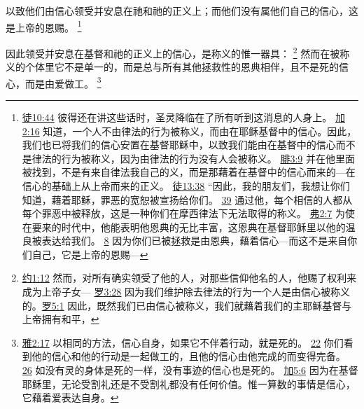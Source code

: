 \documentclass[12pt, a4paper, oneside]{ctexart}
\newcounter{parnum}[section]
\newcommand{\N}{%
   \noindent\refstepcounter{parnum}%
    \makebox[\parindent][l]{\textbf{\arabic{parnum}.}}}
\begin{document}
	以致他们由信心领受并安息在祂和祂的正义上；而他们没有属他们自己的信心，这是上帝的恩赐。
	\footnote {
		\href{https://biblehub.com/acts/10-44.htm}{徒10:44} 彼得还在讲这些话时，圣灵降临在了所有听到这消息的人身上。
		\href{https://biblehub.com/galatians/2-16.htm}{加2:16} 知道，一个人不由律法的行为被称义，而由在耶稣基督中的信心。因此，我们也已将我们的信心安置在基督耶稣中，以致我们能由在基督中的信心而不是律法的行为被称义，因为由律法的行为没有人会被称义。
		\href{https://biblehub.com/philippians/3-9.htm}{腓3:9} 并在他里面被找到，不是有来自律法我自己的义，而是那藉着在基督中的信心而来的---在信心的基础上从上帝而来的正义。
		\href{https://biblehub.com/acts/13-38.htm}{徒13:38} “因此，我的朋友们，我想让你们知道，藉着耶稣，罪恶的宽恕被宣扬给你们。
		\href{https://biblehub.com/acts/13-39.htm}{39} 通过他，每个相信的人都从每个罪恶中被释放，这是一种你们在摩西律法下无法取得的称义。
		\href{https://biblehub.com/ephesians/2-7.htm}{弗2:7} 为使在要来的时代中，他能表明他恩典的无比丰富，这恩典在基督耶稣里以他的温良被表达给我们。
		\href{https://biblehub.com/ephesians/2-8.htm}{8} 因为你们已被拯救是由恩典，藉着信心---而这不是来自你们自己，它是上帝的恩赐---
	}

\N 因此领受并安息在基督和祂的正义上的信心，是称义的惟一器具：
	\footnote {
		\href{https://biblehub.com/john/1-12.htm}{约1:12} 然而，对所有确实领受了他的人，对那些信仰他名的人，他赐了权利来成为上帝子女---
		\href{https://biblehub.com/romans/3-28.htm}{罗3:28} 因为我们维护除去律法的行为一个人是由信心被称义的。\href{https://biblehub.com/romans/5-1.htm}{罗5:1} 因此，既然我们已由信心被称义，我们就藉着我们的主耶稣基督与上帝拥有和平，
	}
	然而在被称义的个体里它不是单一的，而是总与所有其他拯救性的恩典相伴，且不是死的信心，而是由爱做工。
	\footnote {
		\href{https://biblehub.com/james/2-17.htm}{雅2:17} 以相同的方法，信心自身，如果它不伴着行动，就是死的。
		\href{https://biblehub.com/james/2-22.htm}{22} 你们看到他的信心和他的行动是一起做工的，且他的信心由他完成的而变得完备。
		\href{https://biblehub.com/james/2-26.htm}{26} 如没有灵的身体是死的一样，没有事迹的信心也是死的。
		\href{https://biblehub.com/galatians/5-6.htm}{加5:6} 因为在基督耶稣里，无论受割礼还是不受割礼都没有任何价值。惟一算数的事情是信心，它藉着爱表达自身。
	}
\end{document}
